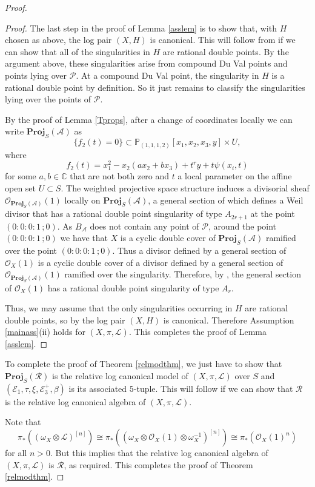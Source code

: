 \documentclass{amsart}
\begin{document}
\begin{proof}
\begin{proof}
The last step in the proof of Lemma \ref{asslem} is to show that, with $H$ chosen as above, the log pair $(X,H)$ is canonical. This will follow from \cite[Theorem 5.34]{bgav} if we can show that all of the singularities in $H$ are rational double points. By the argument above, these singularities arise from compound Du Val points and points lying over ${\mathcal{P}}$. At a compound Du Val point, the singularity in $H$ is a rational double point by definition. So it just remains to classify the singularities lying over the points of ${\mathcal{P}}$.

By the proof of Lemma \ref{Tprops}, after a change of coordinates locally we can write $\mathbf{Proj}_S({\mathcal{A}})$ as 
\[\{f_2(t)=0\} \subset {\mathbb{P}}_{(1,1,1,2)}[x_1,x_2,x_3,y] \times U,\]
where 
\[f_2(t) = x_1^2 - x_2(ax_2 + bx_3) + t^r y + t \psi(x_i,t)\]
for some $a,b \in {\mathbb{C}}$ that are not both zero and $t$ a local parameter on the affine open set $U \subset S$. The weighted projective space structure induces a divisorial sheaf ${\mathcal{O}}_{\mathbf{Proj}_S({\mathcal{A}})}(1)$ locally on $\mathbf{Proj}_S({\mathcal{A}})$, a general section of which defines a Weil divisor that has a rational double point singularity of type $A_{2r+1}$ at the point $(0\!:\!0\!:\!0\!:\!1\,;0)$. As $B_{\mathcal{A}}$ does not contain any point of ${\mathcal{P}}$, around the point $(0\!:\!0\!:\!0\!:\!1\,;0)$ we have that $X$ is a cyclic double cover of $\mathbf{Proj}_S({\mathcal{A}})$ ramified over the point $(0\!:\!0\!:\!0\!:\!1\,;0)$. Thus a divisor defined by a general section of ${\mathcal{O}}_{X}(1)$ is a cyclic double cover of a divisor defined by a general section of ${\mathcal{O}}_{\mathbf{Proj}_S({\mathcal{A}})}(1)$ ramified over the singularity. Therefore, by \cite[Theorem 5.43]{bgav}, the general section of ${\mathcal{O}}_{X}(1)$ has a rational double point singularity of type $A_{r}$.

Thus, we may assume that the only singularities occurring in $H$ are rational double points, so by \cite[Theorem 5.34]{bgav} the log pair $(X,H)$ is canonical. Therefore Assumption \ref{mainass}(ii) holds for $(X,\pi,{\mathcal{L}})$. This completes the proof of Lemma \ref{asslem}. \end{proof}

To complete the proof of Theorem \ref{relmodthm}, we just have to show that $\mathbf{Proj}_S({\mathcal{R}})$ is the relative log canonical model of $(X,\pi,{\mathcal{L}})$ over $S$ and $({\mathcal{E}}_1,\tau,\xi,{\mathcal{E}}_3^+,\beta)$ is its associated $5$-tuple. This will follow if we can show that ${\mathcal{R}}$ is the relative log canonical algebra of $(X,\pi,{\mathcal{L}})$.

Note that
\[ \pi_*((\omega_X \otimes {\mathcal{L}})^{[n]}) \cong \pi_*((\omega_X \otimes {\mathcal{O}}_X(1) \otimes \omega_X^{-1})^{[n]}) \cong \pi_*({\mathcal{O}}_X(1)^{n})\]
for all $n > 0$. But this implies that the relative log canonical algebra of $(X,\pi,{\mathcal{L}})$ is ${\mathcal{R}}$, as required. This completes the proof of Theorem \ref{relmodthm}.\end{proof}
\end{document}
